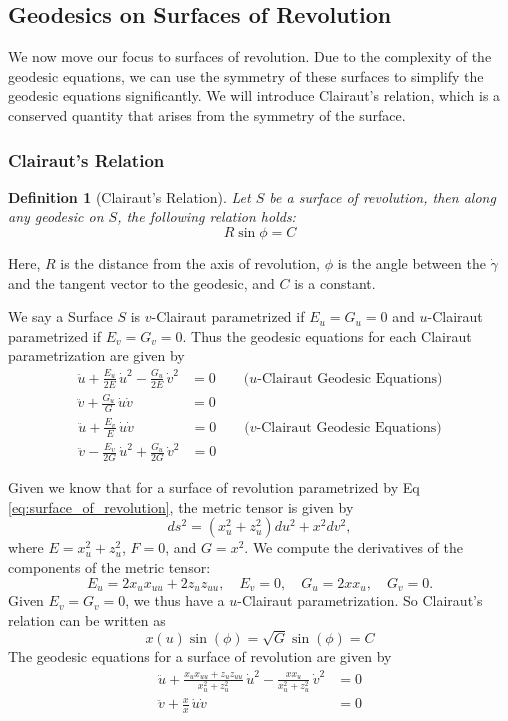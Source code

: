 \documentclass[12pt]{article}
\newtheorem{definition}{Definition}[section]
\begin{document}
\subsection{Geodesics on Surfaces of Revolution}

We now move our focus to surfaces of revolution.
Due to the complexity of the geodesic equations, we can use the symmetry of these surfaces to simplify the geodesic equations significantly.
We will introduce Clairaut's relation, which is a conserved quantity that arises from the symmetry of the surface.

\subsubsection{Clairaut's Relation}

\begin{definition}[Clairaut's Relation]
Let \(S\) be a surface of revolution, then along any geodesic on \(S\), the following relation holds:
\[
R\sin\phi = C
\]
\end{definition}
Here, \(R\) is the distance from the axis of revolution, \(\phi\) is the angle between the $\dot{\gamma}$ and the tangent vector to the geodesic, and \(C\) is a constant.

We say a Surface $S$ is $v$-Clairaut parametrized if $E_{u} = G_{u} = 0$ and $u$-Clairaut parametrized if $E_{v} = G_{v} = 0$.
Thus the geodesic equations for each Clairaut parametrization are given by
\begin{align*}
    \ddot{u} + \frac{E_{u}}{2E}\,\dot{u}^2 - \frac{G_{u}}{2E}\,\dot{v}^{2} &= 0 \qquad (u\text{-Clairaut Geodesic Equations)} \\
    \ddot{v} + \frac{G_{u}}{G}\,\dot{u}\dot{v} &= 0
\end{align*}
\begin{align*}
    \ddot{u} + \frac{E_{v}}{E}\,\dot{u}\dot{v} &= 0 \qquad (v\text{-Clairaut Geodesic Equations)} \\
    \ddot{v} - \frac{E_{v}}{2G}\,\dot{u}^2 + \frac{G_{u}}{2G}\,\dot{v}^2 &= 0
\end{align*}

Given we know that for a surface of revolution parametrized by Eq \eqref{eq:surface_of_revolution}, the metric tensor is given by
\[
    ds^2 = \left( x_{u}^2 + z_u^2 \right) du^2 + x^2 dv^2,
\]
where $E = x_{u}^2 + z_u^2$, $F = 0$, and $G = x^2$.
We compute the derivatives of the components of the metric tensor:
\[
    E_u = 2 x_u x_{uu} + 2 z_u z_{uu}, \quad E_v = 0, \quad G_u = 2 x x_u, \quad G_v = 0.
\]
Given $E_v = G_v = 0$, we thus have a $u$-Clairaut parametrization.
So Clairaut's relation can be written as
\begin{equation} \label{eq:Clairaut_relation_u}
    x(u) \sin(\phi) = \sqrt{G} \sin(\phi) = C
\end{equation}
The geodesic equations for a surface of revolution are given by
\begin{align*}
    \ddot{u} + \frac{x_u x_{uu} + z_u z_{uu}}{x_{u}^2 + z_u^2}\,\dot{u}^2 - \frac{x x_u}{x_{u}^2 + z_u^2}\,\dot{v}^{2} &= 0 \\
    \ddot{v} + \frac{x}{x}\,\dot{u}\dot{v} &= 0
\end{align*}
\end{document}
